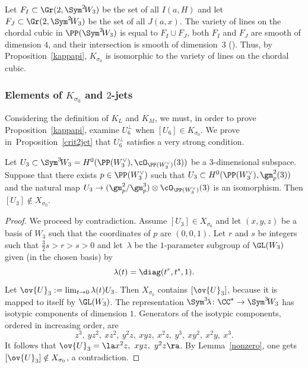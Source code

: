 \begin{rema}\label{rema710}
Let $F_I\subset \Gr(2,\Sym^2\! W_3)$ be the set of all $I(a,H)$ and let $F_J\subset \Gr(2,\Sym^2\! W_3)$ be
the set of all $J(a,x)$. The variety of lines on the chordal cubic in $\PP(\Sym^2\! W_{3})$ is equal to $F_I\cup F_J$, both $F_I$ and $F_J$ are smooth of dimension $4$, and their intersection is smooth of dimension~$3$
(\cite[Prop.\,3.2.4]{vdd}). Thus, by Proposition~\ref{kappapi}, $K_{\sigma_0}$ is isomorphic to
the variety of lines on the chordal cubic.
\end{rema}

\subsubsection{Elements of $K_{\sigma_0}$ and $2$-jets}
Considering the definition of $K_L$ and $K_M$, we must, in order to prove Proposition~\ref{kappapi}, examine $U_6^{\bot}$ when $[U_6]\in K_{\sigma_0}$. We prove in~Proposition~\ref{crit2jet} that $U_6^{\bot}$ satisfies a very strong condition.

\begin{lemm}\label{stab2jet}
Let $U_3\subset \Sym^3 \!W_3=H^0(\PP(W_3^{\vee}),\cO_{\PP(W_3^{\vee})}(3))$ be a $3$-dimensional subspace. Suppose that there exists $p\in\PP(W_3^{\vee})$ such that
$U_3\subset H^0(\PP(W_3^{\vee}),\gm_p^2(3))$ and the natural map
$U_3\to (\gm_p^2/ \gm_p^3)\otimes \cO_{\PP(W_3^{\vee})}(3)$ is an isomorphism.
Then $[U_3]\notin X_{\sigma_0}$.
\end{lemm}

\begin{proof}
We proceed by contradiction. Assume $[U_3] \in X_{\sigma_0}$ and let $(x,y,z)$ be a basis of $W_3$ such that the coordinates of $p$ are $(0,0,1)$. Let $r$ and $s$ be integers such that $ \frac{3}{2}s>r>s>0$ and let~$\lambda$ be the $1$-parameter subgroup of $\GL(W_3)$ given (in the chosen basis) by
\[\label{abps}
\lambda(t)=\diag(t^{r},t^{s},1).
\]
Let $\ov{U}_3 :=\lim_{t\to 0}\lambda(t)U_3$. Then $X_{\sigma_0}$ contains $[\ov{U}_3]$, because it is mapped to itself by $\GL(W_3)$. The representation $\Sym^3\! \lambda\colon\CC^\star\to \Sym^3\! W_3$ has isotypic components of dimension $1$. Generators of the isotypic components, ordered in increasing order, are
\[
z^3,\ yz^2,\ xz^2,\ y^2z,\ xyz,\ x^2z,\ y^3,\ xy^2,\ x^2y,\ x^3.
\]
It follows that $\ov{U}_3 =\la x^2z,\ xyz,\ y^2z\ra$. By Lemma~\ref{nonzero}, one gets $[\ov{U}_3]\notin X_{\sigma_0}$, a contradiction.
\end{proof}

